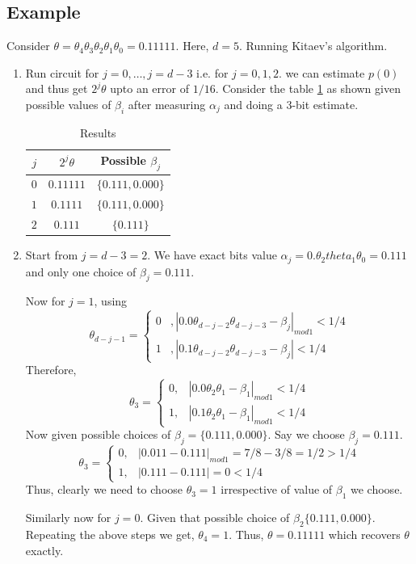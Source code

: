 \subsection{Example}
Consider $\theta=\theta_4\theta_3\theta_2\theta_1\theta_0=0.11111$. Here, $d=5$. Running Kitaev's algorithm.
\begin{enumerate}
    \item Run circuit for $j=0,\ldots,j=d-3$ i.e. for $j=0,1,2$. we can estimate $p(0)$ and thus get $2^j\theta$ upto an error of $1/16$. Consider the table \ref{tab:qpe_exp} as shown given possible values of $\beta_i$ after measuring $\alpha_j$ and doing a 3-bit estimate.
    
    \begin{table}
        \centering
        \begin{tabular}{|c|c|c|}
        \hline
            $j$ & $2^j\theta$ & Possible $\beta_j$\\
            \hline
            $0$ & $0.11111$ & $\{0.111,0.000\}$\\
            \hline
             $1$ & $0.1111$ & $\{0.111,0.000\}$ \\
             \hline
            $2$ & $0.111$ & $\{0.111\}$\\
            \hline
        \end{tabular}
        \caption{Results}
        \label{tab:qpe_exp}
    \end{table}
    \item Start from $j=d-3=2$. We have exact bits value $\alpha_j=0.\theta_2theta_1\theta_0=0.111$ and only one choice of $\beta_j=0.111$.

    Now for $j=1$, using
    \[
    \theta_{d-j-1}=\begin{cases} 0 &,|0.0\theta_{d-j-2}\theta_{d-j-3}-\beta_j|_{mod 1}<1/4\\
    1 &,|0.1\theta_{d-j-2}\theta_{d-j-3}-\beta_j|<1/4 \end{cases}
    \]
    Therefore,
    \[
    \theta_3=\begin{cases} 0, &|0.0\theta_2\theta_1-\beta_1|_{mod1} <1/4 \\ 1, &|0.1\theta_2\theta_1-\beta_1|_{mod1}<1/4 \end{cases}
    \]
    Now given possible choices of $\beta_j=\{0.111,0.000\}$. Say we choose $\beta_j=0.111$.
    \[
    \theta_3=\begin{cases}0, &|0.011-0.111|_{mod1} = 7/8-3/8=1/2>1/4 \\ 1, &|0.111-0.111|=0<1/4 \end{cases}
    \]
    Thus, clearly we need to choose $\theta_3=1$ irrespective of value of $\beta_1$ we choose.

    Similarly now for $j=0$. Given that possible choice of $\beta_2\{0.111,0.000\}$. Repeating the above steps we get, $\theta_4=1$. Thus, $\theta=0.11111$ which recovers $\theta$ exactly.
\end{enumerate}
